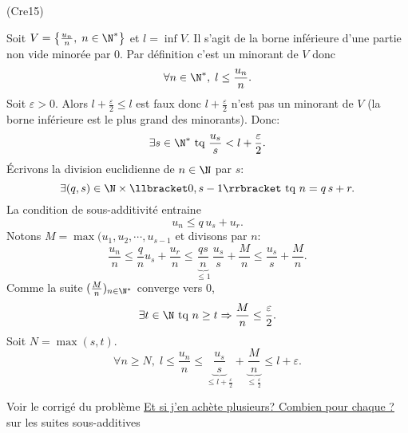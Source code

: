 \begin{tiny}(Cre15)\end{tiny} Soit $V = \left\lbrace \frac{u_{n}}{n},\; n\in \N^*\right\rbrace$ et $l = \inf V$.\newline
Il s'agit de la borne inférieure d'une partie non vide minorée par $0$. Par définition c'est un minorant de $V$ donc
\[
  \forall n \in \N^*, \; l \leq \frac{u_n}{n}.
\]
Soit $\varepsilon >0$. Alors $l + \frac{\varepsilon}{2} \leq l$ est faux donc $l+ \frac{\varepsilon}{2}$ n'est pas un minorant de $V$ (la borne inférieure est le plus grand des minorants). Donc:
\[
  \exists s \in \N^* \text{ tq } \frac{u_s}{s} < l + \frac{\varepsilon}{2}.
\]
\'Ecrivons la division euclidienne de $n\in \N$ par $s$:
\[
  \exists (q,s) \in \N\times \llbracket 0,s-1 \rrbracket \text{ tq } n = q\,s + r.
\]
La condition de sous-additivité entraine
\[
  u_n \leq q\,u_s + u_r.
\]
Notons $M = \max(u_1,u_2,\cdots ,u_{s-1}$ et divisons par $n$:
\[
  \frac{u_n}{n} \leq \frac{q}{n}u_s + \frac{u_r}{n}
  \leq \underset{ \leq 1}{\underbrace{\frac{qs}{n}}}\, \frac{u_s}{s} + \frac{M}{n} 
  \leq \frac{u_s}{s} + \frac{M}{n} .
\]
Comme la suite $(\frac{M}{n})_{n\in \N^*}$ converge vers $0$, 
\[
  \exists t\in \N \text{ tq }n \geq t \Rightarrow \frac{M}{n} \leq \frac{\varepsilon}{2}.
\]
Soit $N = \max(s,t)$.
\[
  \forall n \geq N, \; l \leq \frac{u_n}{n} \leq \underset{\leq l + \frac{\varepsilon}{2}}{\underbrace{\frac{u_s}{s}}} + \underset{\leq \frac{\varepsilon}{2}}{\underbrace{\frac{M}{n}}} 
  \leq l + \varepsilon.
\]

Voir le corrigé du problème  \href{http://back.maquisdoc.net/v-1/index.php?act=chelt&id_elt=8876}{Et si j'en achète plusieurs? Combien pour chaque ?} sur les suites sous-additives
